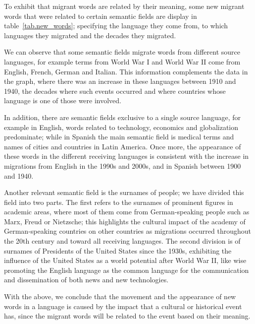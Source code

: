 \documentclass[10pt,letterpaper]{article} %
\begin{document}
To exhibit that migrant words are related by their meaning, some new migrant words that were related to certain semantic fields are display in table~\ref{tab.new_words}; specifying the language they come from, to which languages they migrated and the decades they migrated.

We can observe that some semantic fields migrate words from different source languages, for example terms from World War I and World War II come from English, French, German and Italian. This information complements the data in the graph, where there was an increase in these languages ​between 1910 and 1940, the decades where such events occurred and where countries whose language is one of those were involved.

In addition, there are semantic fields exclusive to a single source language, for example in English, words related to technology, economics and globalization predominate; while in Spanish the main semantic field is medical terms and names of cities and countries in Latin America. Once more, the appearance of these words in the different receiving languages ​​is consistent with the increase in migrations from English in the 1990s and 2000s, and in Spanish between 1900 and 1940.

Another relevant semantic field is the surnames of people; we have divided this field into two parts. The first refers to the surnames of prominent figures in academic areas, where most of them come from German-speaking people such as Marx, Freud or Nietzsche; this highlights the cultural impact of the academy of German-speaking countries on other countries as migrations occurred throughout the 20th century and toward all receiving languages. The second division is of surnames of Presidents of the United States since the 1930s, exhibiting the influence of the United States as a world potential after World War II, like wise promoting the English language as the common language for the communication and dissemination of both news and new technologies.


With the above, we conclude that the movement and the appearance of new words in a language is caused by the impact that a cultural or historical event has, since the migrant words will be related to the event based on their meaning.



\end{document}
